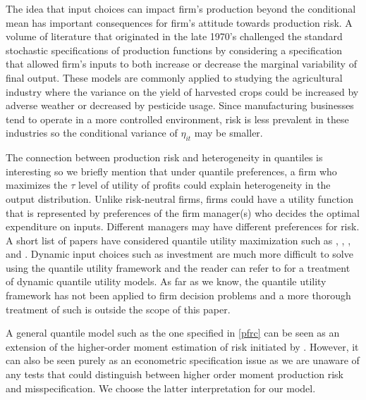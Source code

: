\documentclass[11pt]{article}
\begin{document}
The idea that input choices can impact firm's production beyond the conditional mean has important consequences for firm's attitude towards production risk. A volume of literature that originated in the late 1970's challenged the standard stochastic specifications of production functions \citep{Just1978,Just1979} by considering a specification that allowed firm's inputs to both increase or decrease the marginal variability of final output. These models are commonly applied to studying the agricultural industry where the variance on the yield of harvested crops could be increased by adverse weather or decreased by pesticide usage. Since manufacturing businesses tend to operate in a more controlled environment, risk is less prevalent in these industries so the conditional variance of $\eta_{it}$ may be smaller.

The connection between production risk and heterogeneity in quantiles is interesting so we briefly mention that under quantile preferences, a firm who maximizes the $\tau$ level of utility of profits could explain heterogeneity in the output distribution. Unlike risk-neutral firms, firms could have a utility function that is represented by preferences of the firm manager(s) who decides the optimal expenditure on inputs. Different managers may have different preferences for risk. A short list of papers have considered quantile utility maximization such as \cite{Manski1988}, \cite{ROSTEK2009}, \cite{Chambers2007}, and \cite{Bhattacharya2009}. Dynamic input choices such as investment are much more difficult to solve using the quantile utility framework and the reader can refer to \cite{Castro2017} for a treatment of dynamic quantile utility models. As far as we know, the quantile utility framework has not been applied to firm decision problems and a more thorough treatment of such is outside the scope of this paper.

A general quantile model such as the one specified in \eqref{pfrc} can be seen as an extension of the higher-order moment estimation of risk initiated by \cite{Antle1983}. However, it can also be seen purely as an econometric specification issue as we are unaware of any tests that could distinguish between higher order moment production risk and misspecification. We choose the latter interpretation for our model. 
\end{document}
